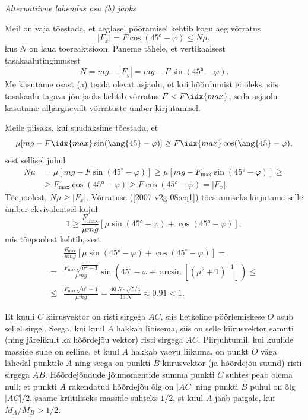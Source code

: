 \documentclass[10pt]{article}
\begin{document}
{\vspace{0.5\baselineskip}

\emph{Alternatiivne lahendus osa (b) jaoks} 

Meil on vaja tõestada, et aeglasel pööramisel kehtib kogu aeg võrratus
\[
\left|F_{x}\right|=F \cos \left(\ang{45}-\varphi\right) \leq N \mu,
\]
kus $N$ on laua toereaktsioon. Paneme tähele, et vertikaalsest tasakaalutingimusest
\[
N=m g-\left|F_{y}\right|=m g-F \sin \left(\ang{45}-\varphi\right).
\]
Me kasutame osast (a) teada olevat asjaolu, et kui hõõrdumist ei oleks, siis tasakaalu tagava jõu jaoks kehtib võrratus $F < F\idx{max}$, seda asjaolu kasutame alljärgnevalt võrratuste ümber kirjutamisel.

Meile piisaks, kui suudaksime tõestada, et
\begin{equation}\label{2007-v2g-08:eq1}
\mu [mg - F\idx{max} \sin (\ang{45} - \varphi )] \geq F\idx{max} \cos (\ang{45} - \varphi ),
\end{equation}
sest sellisel juhul
\[
\begin{aligned}
N \mu &=\mu\left[m g-F \sin \left(45^{\circ}-\varphi\right)\right] \geq \mu\left[m g-F_{\max } \sin \left(\ang{45}-\varphi\right)\right] \geq \\ & \geq F_{\max } \cos \left(\ang{45}-\varphi\right) \geq F \cos \left(\ang{45}-\varphi\right)=\left|F_{x}\right|.
\end{aligned}
\]
Tõepoolest, $N\mu \geq |F_x|$. Võrratuse (\ref{2007-v2g-08:eq1}) tõestamiseks kirjutame selle ümber ekvivalentsel kujul
\[
1 \geq \frac{F_{\max }}{\mu m g}\left[\mu \sin \left(\ang{45}-\varphi\right)+\cos \left(\ang{45}-\varphi\right)\right],
\]
mis tõepoolest kehtib, sest
\[
\begin{aligned} 
& \frac{F_{\max }}{\mu m g}\left[\mu \sin \left(\ang{45}-\varphi\right)+\cos \left(45^{\circ}-\varphi\right)\right]=\\=& \frac{F_{\max } \sqrt{\mu^{2}+1}}{\mu m g} \sin \left(45^{\circ}-\varphi+\arcsin \left[\left(\mu^{2}+1\right)^{-1}\right]\right) \leq \\ \leq & \frac{F_{\max } \sqrt{\mu^{2}+1}}{\mu m g}=\frac{\SI{40}{N} \cdot \sqrt{5 / 4}}{\SI{49}{N}} \approx \num{0,91}<1. 
\end{aligned}
\]
\probend
\bigskip


\solu
Et kuuli $C$ kiirusvektor on risti sirgega $AC$, siis hetkeline pöörlemiskese $O$ asub sellel sirgel. Seega, kui kuul $A$ hakkab libisema, siis on selle kiirusvektor samuti (ning järelikult ka hõõrdejõu vektor) risti sirgega $AC$. Piirjuhtumil, kui kuulide masside suhe on selline, et kuul $A$ hakkab vaevu liikuma, on punkt $O$ väga lähedal punktile $A$ ning seega on punkti $B$ kiirusvektor (ja hõõrdejõu suund) risti sirgega $AB$. Hõõrdejõudude jõumomentide summa punkti $C$ suhtes peab olema null; et punkti $A$ rakendatud hõõrdejõu õlg on $|AC|$ ning punkti $B$ puhul on õlg $|AC|/2$, saame kriitiliseks masside suhteks $1/2$, st kuul $A$ jääb paigale, kui $M_A/M_B > 1/2$.

}
\end{document}
